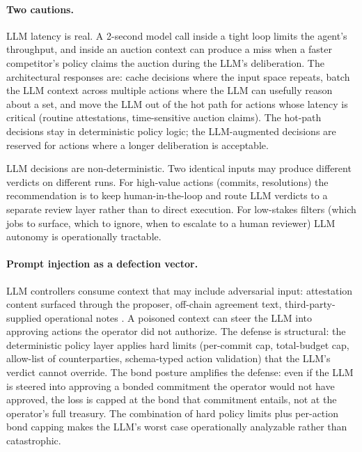 \documentclass[11pt,a4paper]{article}
\theoremstyle{definition}
\theoremstyle{remark}
\begin{document}
\paragraph{Two cautions.}
LLM latency is real. A 2-second model call inside a tight loop limits
the agent's throughput, and inside an auction context can produce a
miss when a faster competitor's policy claims the auction during the
LLM's deliberation. The architectural responses are: cache decisions
where the input space repeats, batch the LLM context across multiple
actions where the LLM can usefully reason about a set, and move the
LLM out of the hot path for actions whose latency is critical
(routine attestations, time-sensitive auction claims). The hot-path
decisions stay in deterministic policy logic; the LLM-augmented
decisions are reserved for actions where a longer deliberation is
acceptable.

LLM decisions are non-deterministic. Two identical inputs may produce
different verdicts on different runs. For high-value actions (commits,
resolutions) the recommendation is to keep human-in-the-loop and
route LLM verdicts to a separate review layer rather than to direct
execution. For low-stakes filters (which jobs to surface, which to
ignore, when to escalate to a human reviewer) LLM autonomy is
operationally tractable.

\paragraph{Prompt injection as a defection vector.}
LLM controllers consume context that may include adversarial input:
attestation content surfaced through the proposer, off-chain
agreement text, third-party-supplied operational notes
\citep{greshake2023injection}. A poisoned context can steer the
LLM into approving actions the operator did not authorize. The
defense is structural: the deterministic policy layer applies
hard limits (per-commit cap, total-budget cap, allow-list of
counterparties, schema-typed action validation) that the LLM's
verdict cannot override. The bond posture amplifies the defense:
even if the LLM is steered into approving a bonded commitment the
operator would not have approved, the loss is capped at the bond
that commitment entails, not at the operator's full treasury. The
combination of hard policy limits plus per-action bond capping
makes the LLM's worst case operationally analyzable rather than
catastrophic.
\end{document}

